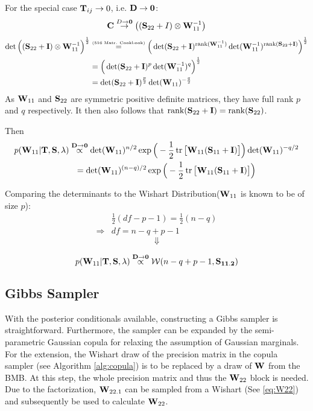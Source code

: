 For the special case $\mathbf{T}_{ij}\rightarrow0$, i.e. $\mathbf{D}\rightarrow\mathbf{0}$:
$$
\mathbf{C}\overset{D\rightarrow\mathbf{0}}{\rightarrow}
\big(
	(\mathbf{S}_{22}+I) \otimes \mathbf{W}_{11}^{-1}
\big)
$$
\begin{align*}
\det
\Big(
	(\mathbf{S}_{22} + \mathbf{I}) \otimes \mathbf{W}_{11}^{-1}
\Big)^{\frac{1}{2}}
&\overset{\text{\tiny{(516 Matr. Cookbook)}}}{=}
\Big(
	\det(\mathbf{S}_{22} + \mathbf{I})^{\text{rank}(\mathbf{W}_{11}^{-1})} 
	\det(\mathbf{W}_{11}^{-1})^{\text{rank}(\mathbf{S}_{22}+\mathbf{I})}
\Big)^{\frac{1}{2}}
\\
&=
\Big(
\det(\mathbf{S}_{22} + \mathbf{I})^{p} 
\det(\mathbf{W}_{11}^{-1})^{q}
\Big)^{\frac{1}{2}}
\\
&= 
\det(\mathbf{S}_{22} + \mathbf{I})^{\frac{p}{2}} 
\det(\mathbf{W}_{11})^{-\frac{q}{2}}
\end{align*}
As $\mathbf{W}_{11}$  and $\mathbf{S}_{22}$ are symmetric positive definite matrices, they have full rank $p$ and $q$ respectively. 
It then also follows that $\text{rank}(\mathbf{S}_{22} + \mathbf{I})= \text{rank}(\mathbf{S}_{22})$.

Then
\begin{align*}
 p(\mathbf{W}_{11} |  \mathbf{T}, \mathbf{S}, \lambda)
 &\overset{\mathbf{D}\rightarrow\mathbf{0}}{\propto}
\det(\mathbf{W}_{11})^{n/2} \exp \Big( - \frac{1}{2} \operatorname{tr}\big[ \mathbf{W}_{11} (\mathbf{S}_{11} + \mathbf{I}) \big]\Big)
\det(\mathbf{W}_{11})^{-{q}/{2}}
\\
&\ \  =
\det(\mathbf{W}_{11})^{(n-q)/2} \exp \Big( - \frac{1}{2} \operatorname{tr}\big[ \mathbf{W}_{11} (\mathbf{S}_{11} + \mathbf{I}) \big]\Big)
\end{align*}

Comparing the determinants to the Wishart Distribution($\mathbf{W}_{11}$ is known to be of size $p$):
\begin{align*}
&\frac{1}{2}(df-p-1) = \frac{1}{2}(n-q)
\\
\Rightarrow &df = n-q+p-1
\end{align*}
$$\Downarrow$$
\begin{tcolorbox}[colback=red!5!white,colframe=red!60!black, title= $\Wxx|\matr{T}\text{,}\matr{S}\text{,}\lambda$ for special case $T_{ij}\rightarrow\infty$]
	\begin{equation}
	p(\mathbf{W}_{11} |  \mathbf{T}, \mathbf{S}, \lambda)
	\overset{\mathbf{D}\rightarrow\mathbf{0}}{\propto}
	\mathcal{W}(n-q+p-1, \mathbf{\mathbf{S}_{11.2}})
	\end{equation}
\end{tcolorbox}

\subsection{Gibbs Sampler}
With the posterior conditionals available, constructing a Gibbs sampler is straightforward.
Furthermore, the sampler can be expanded by the semi-parametric Gaussian copula for relaxing the assumption of Gaussian marginals.
For the extension, the Wishart draw of the precision matrix in the copula sampler 
(see Algorithm \autoref{alg:copula}) is to be replaced by a draw of $\mathbf{W}$ from the \gls{BMB}.
At this step, the whole precision matrix and thus the $\mathbf{W}_{22}$ block is needed.
Due to the factorization, $\mathbf{W}_{22.1}$ can be sampled from a Wishart (See \autoref{eq:W22}) and subsequently be used to calculate $\mathbf{W}_{22}$.

